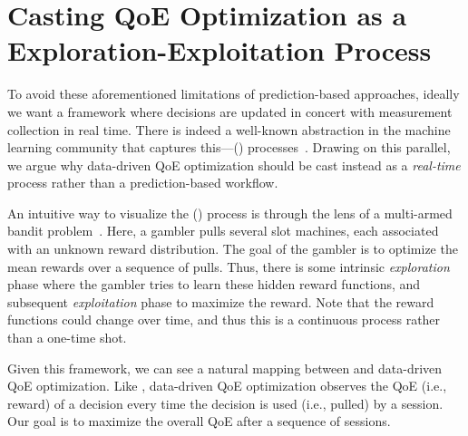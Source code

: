 \section{Casting QoE Optimization as a Exploration-Exploitation Process}
\label{sec:pytheas:casting}

To avoid these aforementioned limitations of prediction-based approaches, ideally we
want a framework  where decisions are updated in concert with measurement collection in real time.
There is indeed a well-known abstraction in the
machine learning community that captures this---\mablong (\mab) 
processes~\cite{mab}.  Drawing on this parallel, we argue why   data-driven QoE
optimization should be cast instead as a {\em real-time \mab} process rather
than a prediction-based workflow.
% 



 An intuitive way to visualize the \mablong (\mab) process is through the lens of 
a  multi-armed bandit problem~\cite{mab}.  Here, a gambler pulls
several slot machines, each associated with 
an unknown reward distribution.
The goal of the gambler is to optimize
the mean rewards over a sequence of pulls. 
 Thus, there is some intrinsic {\em exploration} phase where
 the gambler tries to learn these hidden reward functions, and subsequent  
{\em exploitation} phase to maximize the reward. Note that the reward 
 functions could  change over time, and thus this is a 
 continuous process rather than a one-time shot.
 
  Given this framework,  we can see a natural mapping between \mab and data-driven QoE optimization.  
Like \mab, data-driven QoE optimization observes the QoE (i.e., reward) of a decision
every time the decision is used (i.e., pulled) by a session.
  Our goal is to maximize the overall QoE after a sequence of 
sessions.

